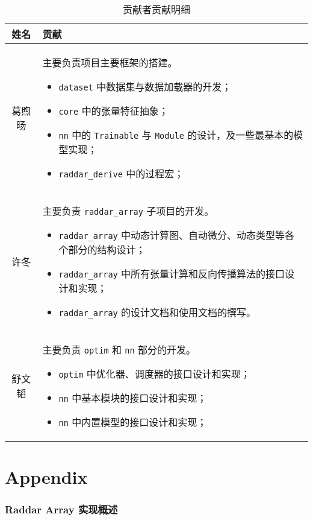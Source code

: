 \documentclass{article}
\begin{document}
\begin{table}[H]
	\centering
	\caption{贡献者贡献明细}
	\label{tab:contrib}
	\begin{tabular}{cp{10cm}}
		\toprule
		姓名   & 贡献                                                                     \\
		\midrule
		葛煦旸 & 主要负责项目主要框架的搭建。
		\begin{itemize}
			\item \verb|dataset| 中数据集与数据加载器的开发；
			\item \verb|core| 中的张量特征抽象；
			\item \verb|nn| 中的 \verb|Trainable| 与 \verb|Module| 的设计，及一些最基本的模型实现；
			\item \verb|raddar_derive| 中的过程宏；
		\end{itemize}                                                                      \\
		许冬   & 主要负责 \verb|raddar_array| 子项目的开发。
		\begin{itemize}
			\item \verb|raddar_array| 中动态计算图、自动微分、动态类型等各个部分的结构设计；
			\item \verb|raddar_array| 中所有张量计算和反向传播算法的接口设计和实现；
			\item \verb|raddar_array| 的设计文档和使用文档的撰写。
		\end{itemize}                                                         \\
		舒文韬 & 主要负责 \verb|optim| 和 \verb|nn| 部分的开发。
		\begin{itemize}
			\item \verb|optim| 中优化器、调度器的接口设计和实现；
			\item \verb|nn| 中基本模块的接口设计和实现；
			\item \verb|nn| 中内置模型的接口设计和实现；
		\end{itemize}                                                         \\
		\bottomrule
	\end{tabular}
\end{table}
\nocite{*}


\appendix
\part*{Appendix}
\section{Raddar Array 实现概述}\label{app:rad_arr_impl}
\end{document}
